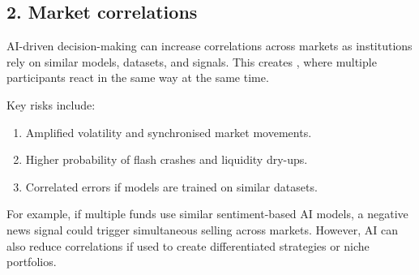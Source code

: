 \subsection*{2. Market correlations}

AI-driven decision-making can increase correlations across markets as institutions rely on
similar models, datasets, and signals. This creates , where multiple
participants react in the same way at the same time.

Key risks include:

\begin{enumerate}[label=\textbf{\alph*)}]
\item Amplified volatility and synchronised market movements.
\item Higher probability of flash crashes and liquidity dry-ups.
\item Correlated errors if models are trained on similar datasets.
\end{enumerate}

For example, if multiple funds use similar sentiment-based AI models, a negative news signal
could trigger simultaneous selling across markets. However, AI can also reduce correlations
if used to create differentiated strategies or niche portfolios.

